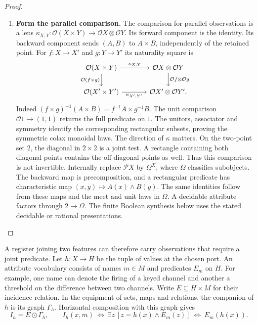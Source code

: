 \documentclass[11pt,a4paper]{article}
\theoremstyle{definition}
\theoremstyle{remark}\newaliascnt{remark}{theorem}
\numberwithin{equation}{section}
\begin{document}
\begin{proof}
\begin{enumerate}[titledsteps]
    \item \textbf{Form the parallel comparison.} The comparison for parallel observations is a lens
\(\kappa_{X,Y}:\mathcal O(X\times Y)\to\mathcal OX\otimes\mathcal OY\).
Its forward component is the identity. Its backward component sends \((A,B)\) to \(A\times B\), independently of the retained point. For \(f:X\to X'\) and \(g:Y\to Y'\) its naturality square is
\begin{equation}\label{eq:predicate-tensor}
\begin{tikzcd}[column sep=large]
 \mathcal O(X\times Y)\arrow[r,"\kappa_{X,Y}"]\arrow[d,"{\mathcal O(f\times g)}"']&
 \mathcal OX\otimes\mathcal OY\arrow[d,"{\mathcal Of\otimes\mathcal Og}"]\\
 \mathcal O(X'\times Y')\arrow[r,"\kappa_{X',Y'}"']&
 \mathcal OX'\otimes\mathcal OY' .
\end{tikzcd}
\end{equation}
Indeed \((f\times g)^{-1}(A\times B)=f^{-1}A\times g^{-1}B\). The unit comparison \(\mathcal O1\to(1,1)\) returns the full predicate on \(1\). The unitors, associator and symmetry identify the corresponding rectangular subsets, proving the symmetric colax monoidal laws. The direction of \(\kappa\) matters. On the two-point set \(2\), the diagonal in \(2\times2\) is a joint test. A rectangle containing both diagonal points contains the off-diagonal points as well. Thus this comparison is not invertible. Internally replace \(\mathcal P X\) by \(\Omega^X\), where \(\Omega\) classifies subobjects. The backward map is precomposition, and a rectangular predicate has characteristic map \((x,y)\mapsto A(x)\wedge B(y)\). The same identities follow from these maps and the meet and unit laws in \(\Omega\). A decidable attribute factors through \(2\to\Omega\). The finite Boolean synthesis below uses the stated decidable or rational presentations.\qedhere
\end{enumerate}
\end{proof}
A register joining two features can therefore carry observations that require a joint predicate.
Let $h:X\to H$ be the tuple of values at the chosen port. An attribute vocabulary consists of names $m\in M$ and predicates $E_m$ on $H$. For example, one name can denote the firing of a keyed channel and another a threshold on the difference between two channels. Write $E\subseteq H\times M$ for their incidence relation. In the equipment of sets, maps and relations, the companion of $h$ is its graph $\Gamma_h$. Horizontal composition with this graph gives
\begin{equation}\label{eq:concept-incidence}
 I_h=E\odot\Gamma_h,\qquad
 I_h(x,m)\ \Longleftrightarrow\
 \exists z\,[z=h(x)\wedge E_m(z)]\ \Longleftrightarrow\ E_m(h(x)).
\end{equation}
\end{document}
